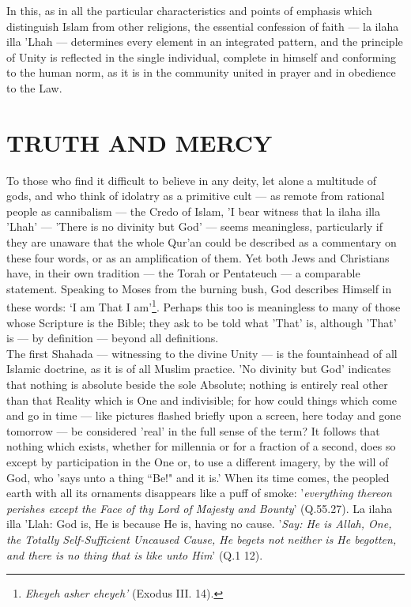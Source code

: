\documentclass[10pt, twoside,openright]{book}
\begin{document}
In this, as in all the particular characteristics and points of emphasis which distinguish Islam from 
other religions, the essential confession of faith --- la ilaha illa 'Lhah --- determines every element 
in an integrated pattern, and the principle of Unity is reflected in the single individual, complete 
in himself and conforming to the human norm, as it is in the community united in prayer and in 
obedience to the Law. \\

\chapter{TRUTH AND MERCY}

To those who find it difficult to believe in any deity, let alone a multitude of gods, and who think 
of idolatry as a primitive cult --- as remote from rational people as cannibalism --- the Credo of Islam, 
'I bear witness that la ilaha illa 'Lhah' --- 'There is no divinity but God' --- seems meaningless, 
particularly if they are unaware that the whole Qur'an could be described as a commentary on these 
four words, or as an amplification of them. Yet both Jews and Christians have, in their own tradition 
--- the Torah or Pentateuch --- a comparable statement. Speaking to Moses from the burning bush, God 
describes Himself in these words: `I am That I am'\footnote{\emph{Eheyeh asher eheyeh'} (Exodus III. 14).}. Perhaps this too is meaningless to many of those whose Scripture is the Bible; they ask to be told what 'That' is, although 'That' is --- by definition --- beyond all definitions. \\

The first Shahada --- witnessing to the divine Unity --- is the fountainhead of all Islamic doctrine, as 
it is of all Muslim practice. 'No divinity but God' indicates that nothing is absolute beside the 
sole Absolute; nothing is entirely real other than that Reality which is One and indivisible; for how 
could things which come and go in time --- like pictures flashed briefly upon a screen, here today and 
gone tomorrow --- be considered 'real' in the full sense of the term? It follows that nothing which 
exists, whether for millennia or for a fraction of a second, does so except by participation in the 
One or, to use a different imagery, by the will of God, who 'says unto a thing ``Be!" and it is.' When 
its time comes, the peopled earth with all its ornaments disappears like a puff of smoke: '\emph{everything thereon perishes except the Face of thy Lord of Majesty and Bounty}' (Q.55.27). La ilaha illa 'Llah: God is, He is because He is, having no cause. '\emph{Say: He is Allah, One, the Totally Self\hyp{}Sufficient Uncaused Cause, He begets not neither is He begotten, and there is no thing that is like unto Him}' (Q.1 12). \\
\end{document}
